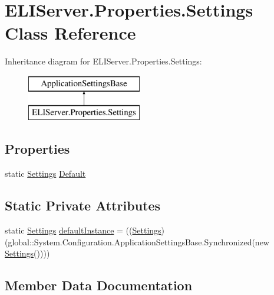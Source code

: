 \hypertarget{class_e_l_i_server_1_1_properties_1_1_settings}{}\section{E\+L\+I\+Server.\+Properties.\+Settings Class Reference}
\label{class_e_l_i_server_1_1_properties_1_1_settings}
Inheritance diagram for E\+L\+I\+Server.\+Properties.\+Settings\+:\begin{figure}[H]
\begin{center}
\leavevmode
\includegraphics[height=2.000000cm]{da/de4/class_e_l_i_server_1_1_properties_1_1_settings}
\end{center}
\end{figure}
\subsection*{Properties}
\begin{DoxyCompactItemize}
\item 
static \hyperlink{class_e_l_i_server_1_1_properties_1_1_settings}{Settings} \hyperlink{class_e_l_i_server_1_1_properties_1_1_settings_a16206a24735937907f927941b5b12095}{Default}
\end{DoxyCompactItemize}
\subsection*{Static Private Attributes}
\begin{DoxyCompactItemize}
\item 
static \hyperlink{class_e_l_i_server_1_1_properties_1_1_settings}{Settings} \hyperlink{class_e_l_i_server_1_1_properties_1_1_settings_a6e5c1b1892f9c886a0b7ed8c50ced868}{default\+Instance} = ((\hyperlink{class_e_l_i_server_1_1_properties_1_1_settings}{Settings})(global\+::\+System.\+Configuration.\+Application\+Settings\+Base.\+Synchronized(new \hyperlink{class_e_l_i_server_1_1_properties_1_1_settings}{Settings}())))
\end{DoxyCompactItemize}


\subsection{Member Data Documentation}
\mbox{\label{class_e_l_i_server_1_1_properties_1_1_settings_a6e5c1b1892f9c886a0b7ed8c50ced868}} 
